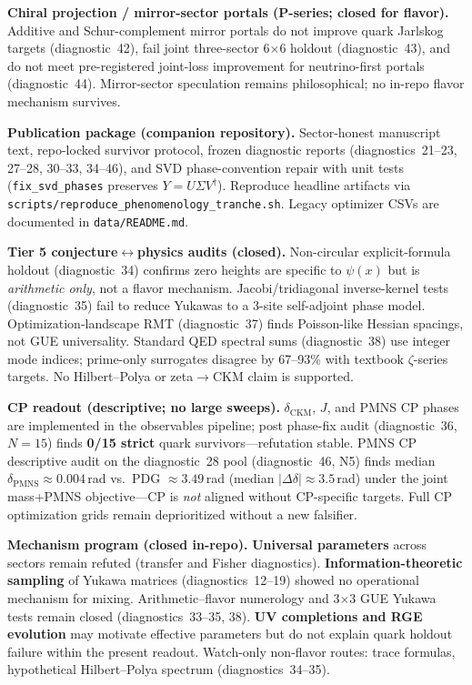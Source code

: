 \documentclass[12pt,a4paper]{article}
\begin{document}
\textbf{Chiral projection / mirror-sector portals (P-series; closed for flavor).}
Additive and Schur-complement mirror portals do not improve quark Jarlskog targets (diagnostic~42), fail joint three-sector 6$\times$6 holdout (diagnostic~43), and do not meet pre-registered joint-loss improvement for neutrino-first portals (diagnostic~44). Mirror-sector speculation remains philosophical; no in-repo flavor mechanism survives.

\textbf{Publication package (companion repository).}
Sector-honest manuscript text, repo-locked survivor protocol, frozen diagnostic reports (diagnostics~21--23, 27--28, 30--33, 34--46), and SVD phase-convention repair with unit tests (\texttt{fix\_svd\_phases} preserves $Y=U\Sigma V^\dagger$). Reproduce headline artifacts via \texttt{scripts/reproduce\_phenomenology\_tranche.sh}. Legacy optimizer CSVs are documented in \texttt{data/README.md}.

\textbf{Tier 5 conjecture$\leftrightarrow$physics audits (closed).}
Non-circular explicit-formula holdout (diagnostic~34) confirms zero heights are specific to $\psi(x)$ but is \emph{arithmetic only}, not a flavor mechanism. Jacobi/tridiagonal inverse-kernel tests (diagnostic~35) fail to reduce Yukawas to a 3-site self-adjoint phase model. Optimization-landscape RMT (diagnostic~37) finds Poisson-like Hessian spacings, not GUE universality. Standard QED spectral sums (diagnostic~38) use integer mode indices; prime-only surrogates disagree by 67--93\% with textbook $\zeta$-series targets. No Hilbert--Polya or zeta$\to$CKM claim is supported.

\textbf{CP readout (descriptive; no large sweeps).}
$\delta_{\text{CKM}}$, $J$, and PMNS CP phases are implemented in the observables pipeline; post phase-fix audit (diagnostic~36, $N{=}15$) finds \textbf{0/15 strict} quark survivors---refutation stable. PMNS CP descriptive audit on the diagnostic~28 pool (diagnostic~46, N5) finds median $\delta_{\text{PMNS}} \approx 0.004$\,rad vs.\ PDG $\approx 3.49$\,rad (median $|\Delta\delta| \approx 3.5$\,rad) under the joint mass+PMNS objective---CP is \emph{not} aligned without CP-specific targets. Full CP optimization grids remain deprioritized without a new falsifier.

\textbf{Mechanism program (closed in-repo).}
\textbf{Universal parameters} across sectors remain refuted (transfer and Fisher diagnostics).
\textbf{Information-theoretic sampling} of Yukawa matrices (diagnostics~12--19) showed no operational mechanism for mixing.
Arithmetic--flavor numerology and 3$\times$3 GUE Yukawa tests remain closed (diagnostics~33--35, 38).
\textbf{UV completions and RGE evolution} may motivate effective parameters but do not explain quark holdout failure within the present readout.
Watch-only non-flavor routes: trace formulas, hypothetical Hilbert--Polya spectrum (diagnostics~34--35).
\end{document}
